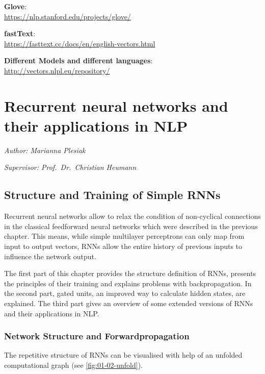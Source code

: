 \documentclass[]{krantz}
\begin{document}
\textbf{Glove}:\\
\url{https://nlp.stanford.edu/projects/glove/}

\textbf{fastText}:\\
\url{https://fasttext.cc/docs/en/english-vectors.html}

\textbf{Different Models and different languages}:\\
\url{http://vectors.nlpl.eu/repository/}

\hypertarget{recurrent-neural-networks-and-their-applications-in-nlp}{%
\chapter{Recurrent neural networks and their applications in NLP}\label{recurrent-neural-networks-and-their-applications-in-nlp}}

\emph{Author: Marianna Plesiak}

\emph{Supervisor: Prof.~Dr.~Christian Heumann}

\hypertarget{structure-and-training-of-simple-rnns}{%
\section{Structure and Training of Simple RNNs}\label{structure-and-training-of-simple-rnns}}

Recurrent neural networks allow to relax the condition of non-cyclical connections in the classical feedforward neural networks which were described in the previous chapter. This means, while simple multilayer perceptrons can only map from input to output vectors, RNNs allow the entire history of previous inputs to influence the network output. \citep{graves2013generating}

The first part of this chapter provides the structure definition of RNNs, presents the principles of their training and explains problems with backpropagation. In the second part, gated units, an improved way to calculate hidden states, are explained. The third part gives an overview of some extended versions of RNNs and their applications in NLP.

\hypertarget{network-structure-and-forwardpropagation}{%
\subsection{Network Structure and Forwardpropagation}\label{network-structure-and-forwardpropagation}}

The repetitive structure of RNNs can be visualised with help of an unfolded computational graph (see \ref{fig:01-02-unfold}).
\end{document}
